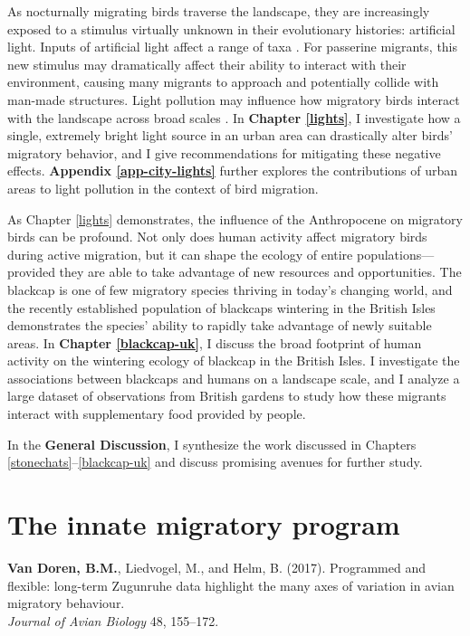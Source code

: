 \documentclass[a4paper, nobind]{templates/ociamthesis}
\begin{document}
As nocturnally migrating birds traverse the landscape, they are increasingly exposed to a stimulus virtually unknown in their evolutionary histories: artificial light. Inputs of artificial light affect a range of taxa \autocite{gastonEcologicalImpactsNighttime2013}. For passerine migrants, this new stimulus may dramatically affect their ability to interact with their environment, causing many migrants to approach and potentially collide with man-made structures. Light pollution may influence how migratory birds interact with the landscape across broad scales \autocite{mclarenArtificialLightNight2018}. In \textbf{Chapter \ref{lights}}, I investigate how a single, extremely bright light source in an urban area can drastically alter birds' migratory behavior, and I give recommendations for mitigating these negative effects. \textbf{Appendix \ref{app-city-lights}} further explores the contributions of urban areas to light pollution in the context of bird migration.

As Chapter \ref{lights} demonstrates, the influence of the Anthropocene on migratory birds can be profound. Not only does human activity affect migratory birds during active migration, but it can shape the ecology of entire populations---provided they are able to take advantage of new resources and opportunities. The blackcap is one of few migratory species thriving in today's changing world, and the recently established population of blackcaps wintering in the British Isles demonstrates the species' ability to rapidly take advantage of newly suitable areas. In \textbf{Chapter \ref{blackcap-uk}}, I discuss the broad footprint of human activity on the wintering ecology of blackcap in the British Isles. I investigate the associations between blackcaps and humans on a landscape scale, and I analyze a large dataset of observations from British gardens to study how these migrants interact with supplementary food provided by people.

In the \textbf{General Discussion}, I synthesize the work discussed in Chapters \ref{stonechats}--\ref{blackcap-uk} and discuss promising avenues for further study.

\printbibliography[segment=\therefsection,heading=subbibliography]

\part{The innate migratory program}

\begin{savequote}
\textbf{Van Doren, B.M.}, Liedvogel, M., and Helm, B. (2017). Programmed
and flexible: long-term Zugunruhe data highlight the many axes of
variation in avian migratory behaviour.\\
\emph{Journal of Avian Biology} 48, 155--172.
\end{savequote}
\end{document}
